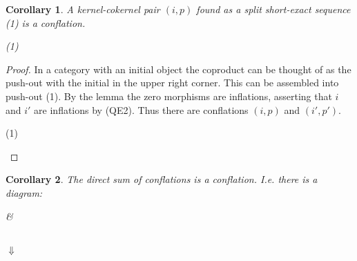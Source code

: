\documentclass[12pt]{article}
\newtheorem{corollary}{Corollary}[theorem]
\theoremstyle{definition}
\theoremstyle{remark}
\begin{document}
            \begin{corollary}
                A kernel-cokernel pair $(i,p)$ found as a split short-exact sequence (1) is a conflation. 
                
                \begin{center}
                    (1)
                \end{center}
            \end{corollary}

            \begin{proof}
                In a category with an initial object the coproduct can be thought of as the push-out with the initial in the upper right corner. This can be assembled into push-out (1).
                By the lemma the zero morphisms are inflations, asserting that $i$ and $i'$ are inflations by (QE2). Thus there are conflations $(i,p)$ and $(i',p')$.

                \begin{center}
                    (1)
                \end{center}
            \end{proof}

            \begin{corollary}
                The direct sum of conflations is a conflation. I.e. there is a diagram:
                \begin{center}
                     \&
                     \\
                    $\Downarrow$ \\
                \end{center}
            \end{corollary}
\end{document}
